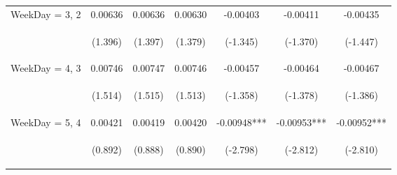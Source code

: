 \documentclass[]{article}
\begin{document}
\begin{center}
\begin{tabular}{lcccccc}
WeekDay = 3, 2 & 0.00636 & 0.00636 & 0.00630 & -0.00403 & -0.00411 & -0.00435 \\
\vspace{4pt} & \begin{footnotesize}(1.396)\end{footnotesize} & \begin{footnotesize}(1.397)\end{footnotesize} & \begin{footnotesize}(1.379)\end{footnotesize} & \begin{footnotesize}(-1.345)\end{footnotesize} & \begin{footnotesize}(-1.370)\end{footnotesize} & \begin{footnotesize}(-1.447)\end{footnotesize} \\
WeekDay = 4, 3 & 0.00746 & 0.00747 & 0.00746 & -0.00457 & -0.00464 & -0.00467 \\
\vspace{4pt} & \begin{footnotesize}(1.514)\end{footnotesize} & \begin{footnotesize}(1.515)\end{footnotesize} & \begin{footnotesize}(1.513)\end{footnotesize} & \begin{footnotesize}(-1.358)\end{footnotesize} & \begin{footnotesize}(-1.378)\end{footnotesize} & \begin{footnotesize}(-1.386)\end{footnotesize} \\
WeekDay = 5, 4 & 0.00421 & 0.00419 & 0.00420 & -0.00948*** & -0.00953*** & -0.00952*** \\
\vspace{4pt} & \begin{footnotesize}(0.892)\end{footnotesize} & \begin{footnotesize}(0.888)\end{footnotesize} & \begin{footnotesize}(0.890)\end{footnotesize} & \begin{footnotesize}(-2.798)\end{footnotesize} & \begin{footnotesize}(-2.812)\end{footnotesize} & \begin{footnotesize}(-2.810)\end{footnotesize} \\

\end{tabular}
\end{center}
\end{document}
